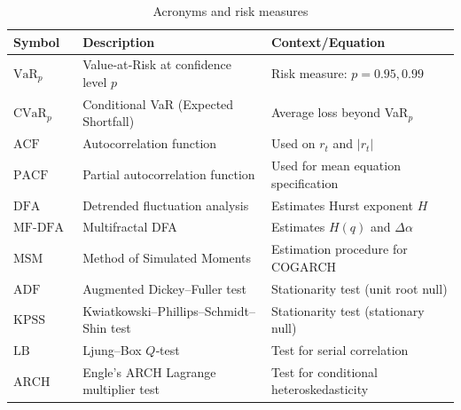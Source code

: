 \begin{table}[H]
\centering
\begin{tabular}{p{2.5cm} p{8cm} p{4cm}}
\hline
\textbf{Symbol} & \textbf{Description} & \textbf{Context/Equation} \\
\hline
$\text{VaR}_p$ & Value‑at‑Risk at confidence level $p$ & Risk measure: $p=0.95,0.99$ \\
$\text{CVaR}_p$ & Conditional VaR (Expected Shortfall) & Average loss beyond VaR$_p$ \\
$\text{ACF}$ & Autocorrelation function & Used on $r_t$ and $|r_t|$ \\
$\text{PACF}$ & Partial autocorrelation function & Used for mean equation specification \\
$\text{DFA}$ & Detrended fluctuation analysis & Estimates Hurst exponent $H$ \\
$\text{MF‑DFA}$ & Multifractal DFA & Estimates $H(q)$ and $\Delta\alpha$ \\
$\text{MSM}$ & Method of Simulated Moments & Estimation procedure for COGARCH \\
$\text{ADF}$ & Augmented Dickey–Fuller test & Stationarity test (unit root null) \\
$\text{KPSS}$ & Kwiatkowski–Phillips–Schmidt–Shin test & Stationarity test (stationary null) \\
$\text{LB}$ & Ljung–Box $Q$‑test & Test for serial correlation \\
$\text{ARCH LM}$ & Engle’s ARCH Lagrange multiplier test & Test for conditional heteroskedasticity \\
\hline
\end{tabular}
\caption{Acronyms and risk measures}
\label{tab:symbols3}
\end{table}